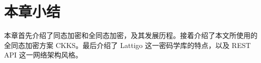 

\section{本章小结}

本章首先介绍了同态加密和全同态加密，及其发展历程。接着介绍了本文所使用的全同态加密方案 CKKS。最后介绍了 Lattigo 这一密码学库的特点，以及 REST API 这一网络架构风格。


